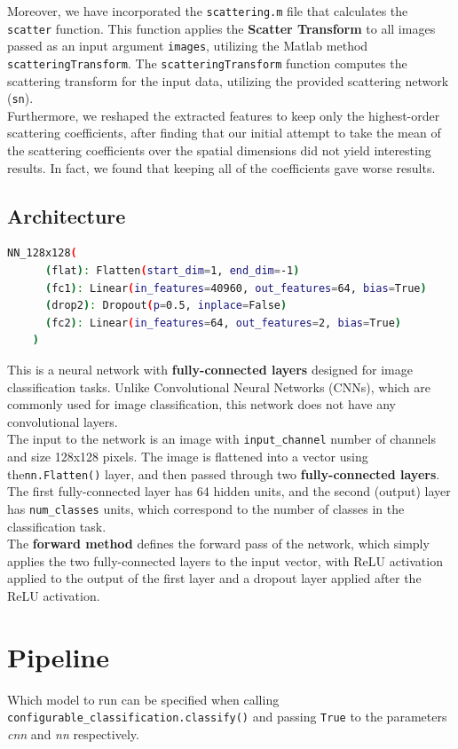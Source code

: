 \documentclass{report}
\begin{document}
Moreover, we have incorporated the \texttt{scattering.m} file that calculates the \texttt{scatter} function. This function applies the \textbf{Scatter Transform} to all images passed as an input argument \texttt{images}, utilizing the Matlab method \texttt{scatteringTransform}. The \texttt{scatteringTransform} function computes the scattering transform for the input data, utilizing the provided scattering network (\texttt{sn}).\\
Furthermore, we reshaped the extracted features to keep only the highest-order scattering coefficients, after finding that our initial attempt to take the mean of the scattering coefficients over the spatial dimensions did not yield interesting results. In fact, we found that keeping all of the coefficients gave worse results.


\subsection{Architecture}
\begin{lstlisting}[language=bash]
    NN_128x128(
      (flat): Flatten(start_dim=1, end_dim=-1)
      (fc1): Linear(in_features=40960, out_features=64, bias=True)
      (drop2): Dropout(p=0.5, inplace=False)
      (fc2): Linear(in_features=64, out_features=2, bias=True)
    )
    \end{lstlisting}
This is a neural network with \textbf{fully-connected layers} designed for image classification tasks. Unlike Convolutional Neural Networks (CNNs), which are commonly used for image classification, this network does not have any convolutional layers. \\
The input to the network is an image with \texttt{input\_channel} number of channels and size 128x128 pixels. The image is flattened into a vector using the\texttt{nn.Flatten()} layer, and then passed through two \textbf{fully-connected layers}. The first fully-connected layer has 64 hidden units, and the second (output) layer has \texttt{num\_classes} units, which correspond to the number of classes in the classification task.\\

The \textbf{forward method} defines the forward pass of the network, which simply applies the two fully-connected layers to the input vector, with ReLU activation applied to the output of the first layer and a dropout layer applied after the ReLU activation.

\section{Pipeline}
Which model to run can be specified when calling \texttt{configurable\_classification.classify()} and passing \texttt{True} to
the parameters \textit{cnn} and \textit{nn} respectively.\\
\end{document}
